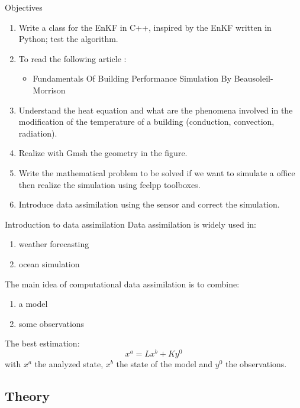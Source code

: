 
\begin{frame}[allowframebreaks]{Objectives}
		
    \begin{enumerate}[\textbullet]
        \item Write a class for the EnKF in C++, inspired by the EnKF written in Python; test the algorithm.
        \item To read the following article :
        \begin{itemize}
            \item Fundamentals Of Building Performance Simulation By Beausoleil-Morrison
        \end{itemize}
        
    \item Understand the heat equation and what are the phenomena involved in the modification of the temperature of a building (conduction, convection, radiation).
    \item Realize with Gmsh the geometry in the figure.
    \item Write the mathematical problem to be solved if we want to simulate a office then realize the simulation using feelpp toolboxes.
    \item Introduce data assimilation using the sensor and correct the simulation.
    \end{enumerate}
\end{frame}




\begin{frame}{Introduction to data assimilation}
Data assimilation is widely used in:
\begin{enumerate}[\textbullet]
       \item weather forecasting
       \item ocean simulation
\end{enumerate}	 
      The main idea of computational data assimilation is to combine:
\begin{enumerate}[\textbullet]
       \item a model
       \item some observations
\end{enumerate}	 
The best estimation:
$$x^a=Lx^b+Ky^0$$
with $x^a$ the analyzed state, $x^b$ the state of the model and $y^0$ the observations.
\end{frame}
\subsection{Theory}

